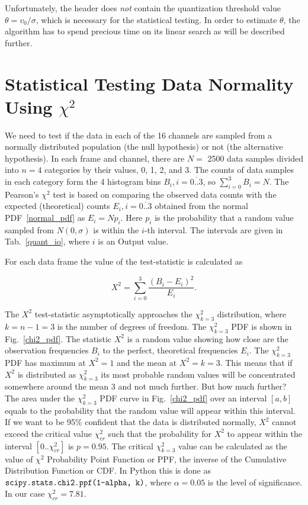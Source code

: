 \documentclass[letterpaper,twoside,12pt]{article}
\begin{document}
Unfortunately, the header does \emph{not} contain the quantization threshold value $\theta = v_0/\sigma$, which is necessary for the statistical testing. In order to estimate $\theta$, the algorithm has to spend precious time on its linear search as will be described further. 




\section{Statistical Testing Data Normality Using $\chi^2$}

We need to test if the data in each of the 16 channels are sampled from a normally distributed population (the null hypothesis) or not (the alternative hypothesis). In each frame and channel, there are $N=$ 2500 data samples divided into $n=4$ categories by their values, 0, 1, 2, and 3. The counts of data samples in each category form the 4 histogram bins $B_i, i=\overline{0 .. 3}$, so $\sum_{i=0}^3 B_i = N$. The Pearson's $\chi^2$ test is based on comparing the observed data counts with the expected (theoretical) counts $E_i, i=\overline{0 .. 3}$ obtained from the normal PDF~\eqref{normal_pdf} as $E_i = Np_i$. Here $p_i$ is the probability that a random value sampled from $N(0,\sigma)$ is within the $i$-th interval. The intervals are given in Tab.~\ref{quant_io}, where $i$ is an Output value. 

For each data frame the value of the test-statistic is calculated as 

\begin{equation}
  \label{chi2_calc}
  X^2 = \sum_{i=0}^3 \frac{(B_i - E_i)^2}{E_i}.
\end{equation}


The $X^2$ test-statistic asymptotically approaches the $\chi^2_{k=3}$ distribution, where $k = n - 1 = 3$ is the number of degrees of freedom. The $\chi^2_{k=3}$ PDF is shown in Fig.~\ref{chi2_pdf}. The statistic $X^2$ is a random value showing how close are the observation frequencies $B_i$ to the perfect, theoretical frequencies $E_i$. The $\chi^2_{k=3}$ PDF has maximum at $X^2=1$ and the mean at $X^2=k=3$. This means that if $X^2$ is distributed as $\chi^2_{k=3}$ its most probable random values will be concentrated somewhere around the mean 3 and not much further. But how much further? The area under the $\chi^2_{k=3}$ PDF curve in Fig.~\ref{chi2_pdf} over an interval $[a,b]$ equals to the probability that the random value will appear within this interval. If we want to be 95\% confident that the data is distributed normally, $X^2$ cannot exceed the critical value $\chi^2_{cr}$ such that the probability for $X^2$ to appear within the interval $[0 .. \chi^2_{cr}]$ is $p=0.95$. The critical $\chi^2_{k=3}$ value can be calculated as the value of $\chi^2$ Probability Point Function or PPF, the inverse of the Cumulative Distribution Function or CDF. In Python this is done as $\verb@scipy.stats.chi2.ppf(1-alpha, k)@$, where $\alpha = 0.05$ is the level of significance. In our case $\chi^2_{cr} = 7.81$. 
\end{document}
